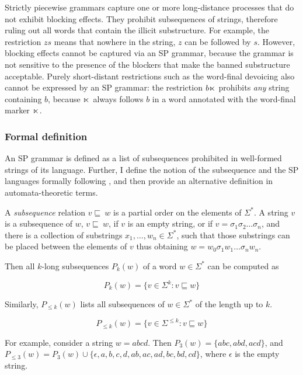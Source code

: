 Strictly piecewise grammars capture one or more long-distance processes that do not exhibit blocking effects.
They prohibit subsequences of strings, therefore ruling out all words that contain the illicit substructure.
For example, the restriction $zs$ means that nowhere in the string, $z$ can be followed by $s$.
However, blocking effects cannot be captured via an SP grammar, because the grammar is not sensitive to the presence of the blockers that make the banned substructure acceptable.
Purely short-distant restrictions such as the word-final devoicing also cannot be expressed by an SP grammar: the restriction $b\ltimes$ prohibits \emph{any} string containing $b$, because $\ltimes$ always follows $b$ in a word annotated with the word-final marker $\ltimes$.



\subsubsection{Formal definition}

An SP grammar is defined as a list of subsequences prohibited in well-formed strings of its language.
Further, I define the notion of the subsequence and the SP languages formally following \cite{Rogers-HeinzEtAl-2010-LPTSS}, and then provide an alternative definition in automata-theoretic terms.



\begin{definition}
A \emph{subsequence} relation $v \sqsubseteq~ w$ is a partial order on the elements of $\Sigma^*$.
A string $v$ is a subsequence of $w$, $v \sqsubseteq~ w$, if $v$ is an empty string, or if $v = \sigma_1\sigma_2\dots\sigma_n$, and there is a collection of substrings $x_1, \dots, w_n \in \Sigma^*$, such that those substrings can be placed between the elements of $v$ thus obtaining $w = w_0\sigma_1 w_1\dots\sigma_n w_n$.

Then all $k$-long subsequences $P_k(w)$ of a word $w \in \Sigma^*$ can be computed as

$$ P_{k}(w) = \{v \in \Sigma^{k} : v \sqsubseteq w\} $$

Similarly, $P_{\leq k}(w)$ lists all subsequences of $w \in \Sigma^*$  of the length up to $k$.

$$ P_{\leq k}(w) = \{v \in \Sigma^{\leq k} : v \sqsubseteq w\} $$
\end{definition}



For example, consider a string $w = abcd$.
Then $P_{3}(w) = \{abc, abd, acd\}$, and $P_{\leq 3}(w) = P_{3}(w) \cup \{\epsilon, a, b, c, d, ab, ac, ad, bc, bd, cd\}$, where $\epsilon$ is the empty string.


